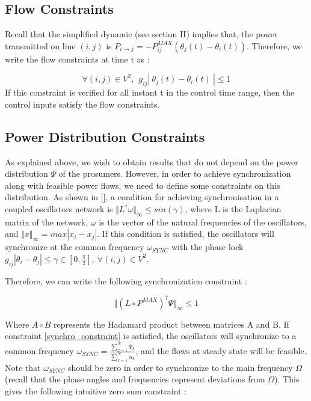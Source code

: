 \documentclass[10pt,twoside%
                ,draft%
        ]{article}
\begin{document}
\subsection{Flow Constraints}

Recall that the simplified dynamic (see section II) implies that, the power transmitted on line $ (i,j)$ is $ P_{i \longrightarrow j} = -P_{ij}^{MAX} \left( \theta_j(t) - \theta_i(t) \right) $. Therefore, we write the flow constraints at time t as :

\begin{equation}
\forall (i,j) \in V^2,\ \ g_{ij} \left|\ \theta_j(t) - \theta_i(t)\ \right| \leq 1
\end{equation}
If this constraint is verified for all instant t in the control time range, then the control inputs satisfy the flow constraints. 



\subsection{Power Distribution Constraints}
As explained above, we wish to obtain results that do not depend on the power distribution $ \Psi $ of the prosumers. However, in order to achieve synchronization along with feasible power flows, we need to define some constraints on this distribution. As shown in [], a condition for achieving synchronisation in a coupled oscillators network is $ \Vert L^{\dagger}\omega \Vert_{\infty} \leq sin(\gamma) $, where L is the Laplacian matrix of the network, $ \omega $ is the vector of the natural frequencies of the oscillators, and $ \Vert x \Vert_{\infty} = max \left| x_i - x_j \right| $. If this condition is satisfied, the oscillators will synchronize at the common frequency $ \omega_{SYNC} $ with the phase lock $ g_{ij}\left| \theta_i - \theta_j \right| \leq    \gamma \in[0,\frac{\pi}{2}],\ \forall (i,j) \in V^2 $.

Therefore, we can write the following synchronization constraint :

\begin{equation}
\label{synchro_constraint}
\Vert \left( L \circ P^{MAX} \right)^{\dagger} \Psi \Vert_{\infty} \leq 1
\end{equation}

Where $ A \circ B $ represents the Hadamard product between matrices A and B. If constraint \ref{synchro_constraint} is satisfied, the oscillators will synchronize to a common frequency $ \omega_{SYNC} = \frac{\sum_{k=1}^{N}\Psi_k}{\sum_{k=1}^{N}\alpha_k} $, and the flows at steady state will be feasible. Note that $\omega_{SYNC} $ should be zero in order to synchronize to the main frequency $\Omega$ (recall that the phase angles and frequencies represent deviations from $ \Omega$). This gives the following intuitive zero sum constraint :
\end{document}
